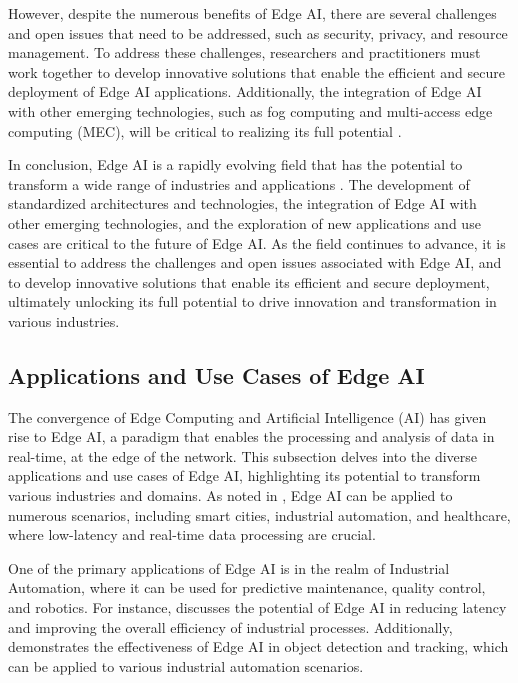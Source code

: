 \documentclass[11pt,a4paper]{article}
\begin{document}
However, despite the numerous benefits of Edge AI, there are several challenges and open issues that need to be addressed, such as security, privacy, and resource management. To address these challenges, researchers and practitioners must work together to develop innovative solutions that enable the efficient and secure deployment of Edge AI applications. Additionally, the integration of Edge AI with other emerging technologies, such as fog computing and multi-access edge computing (MEC), will be critical to realizing its full potential \cite{arxiv:2107.13374}.

In conclusion, Edge AI is a rapidly evolving field that has the potential to transform a wide range of industries and applications \cite{arxiv:2003.12172}. The development of standardized architectures and technologies, the integration of Edge AI with other emerging technologies, and the exploration of new applications and use cases are critical to the future of Edge AI. As the field continues to advance, it is essential to address the challenges and open issues associated with Edge AI, and to develop innovative solutions that enable its efficient and secure deployment, ultimately unlocking its full potential to drive innovation and transformation in various industries.


\subsection{Applications and Use Cases of Edge AI}


The convergence of Edge Computing and Artificial Intelligence (AI) has given rise to Edge AI, a paradigm that enables the processing and analysis of data in real-time, at the edge of the network. This subsection delves into the diverse applications and use cases of Edge AI, highlighting its potential to transform various industries and domains. As noted in \cite{arxiv:1712.04980}, Edge AI can be applied to numerous scenarios, including smart cities, industrial automation, and healthcare, where low-latency and real-time data processing are crucial.

One of the primary applications of Edge AI is in the realm of Industrial Automation, where it can be used for predictive maintenance, quality control, and robotics. For instance, \cite{arxiv:1701.01090} discusses the potential of Edge AI in reducing latency and improving the overall efficiency of industrial processes. Additionally, \cite{arxiv:1906.11056} demonstrates the effectiveness of Edge AI in object detection and tracking, which can be applied to various industrial automation scenarios.
\end{document}
